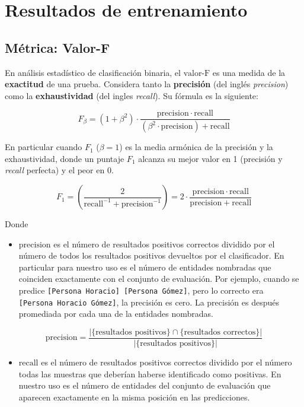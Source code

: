 \documentclass[12pt,a4paper,]{scrartcl}
\providecommand{\tightlist}{%
  \setlength{\itemsep}{0pt}\setlength{\parskip}{0pt}}
\begin{document}
\newpage

\hypertarget{results}{%
\section{Resultados de entrenamiento}\label{results}}

\hypertarget{muxe9trica-valor-f}{%
\subsection{Métrica: Valor-F}\label{muxe9trica-valor-f}}

En análisis estadístico de clasificación binaria, el \(\text{valor-F}\) es una medida de la \textbf{exactitud} de una prueba.
Considera tanto la \textbf{precisión} (del inglés \emph{precision}) como la \textbf{exhaustividad} (del ingles \emph{recall}). Su fórmula es la siguiente:

\[
F_\beta = (1 + \beta^2) \cdot \frac{\mathrm{precision} \cdot \mathrm{recall}}{(\beta^2 \cdot \mathrm{precision}) + \mathrm{recall}}
\]

En particular cuando \(F_1\) (\(\beta = 1\)) es la media armónica de la precisión y la exhaustividad, donde un puntaje \(F_1\) alcanza su mejor valor en 1 (precisión y \emph{recall} perfecta) y el peor en 0.

\[
F_1 = \left(\frac{2}{\mathrm{recall}^{-1} + \mathrm{precision}^{-1}}\right) = 2 \cdot \frac{\mathrm{precision} \cdot \mathrm{recall}}{\mathrm{precision} + \mathrm{recall}}
\]

Donde

\begin{itemize}
\tightlist
\item
  \(\text{precision}\) es el número de resultados positivos correctos dividido por el número de todos los resultados positivos devueltos por el clasificador.
  En particular para nuestro uso es el número de entidades nombradas que coinciden exactamente con el conjunto de evaluación.
  Por ejemplo, cuando se predice \texttt{{[}Persona\ Horacio{]}\ {[}Persona\ Gómez{]}}, pero lo correcto era \texttt{{[}Persona\ Horacio\ Gómez{]}}, la precisión es cero. La precisión es después promediada por cada una de la entidades nombradas.
\end{itemize}

\[
\text{precision}=\frac{|\{\text{resultados positivos}\}\cap\{\text{resultados correctos}\}|}{|\{\text{resultados positivos}\}|}
\]

\begin{itemize}
\tightlist
\item
  \(\text{recall}\) es el número de resultados positivos correctos dividido por el número todas las muestras que deberían haberse identificado como positivas.
  En nuestro uso es el número de entidades del conjunto de evaluación que aparecen exactamente en la misma posición en las predicciones.
\end{itemize}
\end{document}
